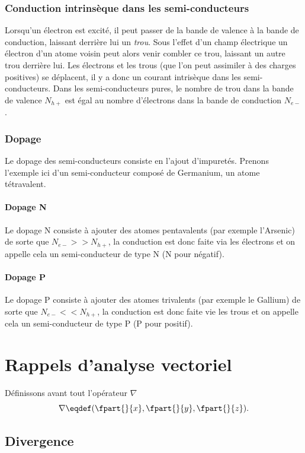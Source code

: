 \subsubsection{Conduction intrinsèque dans les semi-conducteurs}
Lorsqu'un électron est excité, il peut passer de la bande de valence
à la bande de conduction, laissant derrière lui un \emph{trou}.
Sous l'effet d'un champ électrique un électron d'un atome voisin 
peut alors venir combler ce trou, laissant un autre trou derrière lui. 
Les électrons et les trous (que l'on peut assimiler à des charges positives)
se déplacent, il y a donc un courant intrisèque dans les semi-conducteurs.
Dans les semi-conducteurs pures, le nombre de trou dans la bande de valence
$N_{h+}$ est égal au nombre d'électrons dans la bande de conduction $N_{e-}$.
\subsubsection{Dopage}
Le dopage des semi-conducteurs consiste en l'ajout d'impuretés.
Prenons l'exemple ici d'un semi-conducteur composé de Germanium,
un atome tétravalent.

\paragraph{Dopage N}
Le dopage N consiste à ajouter des atomes pentavalents
(par exemple l'Arsenic) de sorte que $N_{e-} >> N_{h+}$, 
la conduction est donc faite via les électrons et on appelle
cela un semi-conducteur de type N (N pour négatif).
\paragraph{Dopage P}
Le dopage P consiste à ajouter des atomes trivalents
(par exemple le Gallium) de sorte que $N_{e-} << N_{h+}$,
la conduction est donc faite vie les trous et on appelle
cela un semi-conducteur de type P (P pour positif).

\appendix
\section{Rappels d'analyse vectoriel}
Définissons avant tout l'opérateur $\nabla$
\[ \nabla  \eqdef (\fpart{}{x}, \fpart{}{y}, \fpart{}{z}).\]
\subsection{Divergence}
